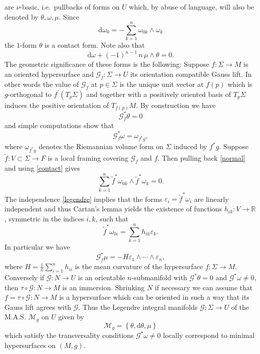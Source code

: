 \documentclass[11pt,letterpaper]{amsart}
\theoremstyle{definition}
\numberwithin{equation}{section}
\begin{document}
are $\nu$-basic, i.e.~pullbacks of forms on $U$ which, by abuse of language, will also be denoted by $\theta,\omega,\mu$. Since
\begin{equation}\label{contact}
{\mathrm{d}}\omega_0=-\sum_{k=1}^n\omega_{0k}\wedge \omega_k
\end{equation}
the $1$-form $\theta$ is a contact form. Note also that
\begin{equation}\label{exact}
{\mathrm{d}}\omega+(-1)^{n-1}\,n\,\mu\wedge\theta=0. 
\end{equation}
The geometric significance of these forms is the following: Suppose $f : \Sigma \to M$ is an oriented hypersurface and $\mathcal{G}_f : \Sigma \to U$ its orientation compatible Gauss lift. In other words the value of $\mathcal{G}_f$ at $p \in \Sigma$ is the unique unit vector at $f(p)$ which is $g$-orthogonal to $f^{\prime}(T_p\Sigma)$ and together with a positively oriented basis of $T_p\Sigma$ induces the positive orientation of $T_{f(p)}M$. By construction we have 
\begin{equation}\label{normal}
\mathcal{G}_f^*\theta=0
\end{equation}
and simple computations show that
\begin{equation}\label{legendre}
\mathcal{G}_f^*\omega=\omega_{f^*g},
\end{equation}
where $\omega_{f^*g}$ denotes the Riemannian volume form on $\Sigma$ induced by $f^*g$. Suppose $\tilde{f} : V \subset \Sigma\to F$ is a local framing covering $\mathcal{G}_f$ and $f$. Then pulling back \eqref{normal} and using \eqref{contact} gives 
$$
\sum_{k=1}^n\tilde{f}^*{\omega_{0k}}\wedge \tilde{f}^*{\omega_k}=0.
$$  
The independence \eqref{legendre} implies that the forms $\varepsilon_i=\tilde{f}^*\omega_i$ are linearly independent and thus Cartan's lemma yields the existence of functions $h_{ik} : V \to {\mathbb{R}}$, symmetric in the indices $i,k$, such that
$$
\tilde{f}^*\omega_{0i}=\sum_{k=1}^n h_{ik} \varepsilon_k. 
$$
In particular we have 
\begin{equation}\label{minimal}
\mathcal{G}_f^*\mu=-H \varepsilon_1\wedge\cdots\wedge\varepsilon_n,
\end{equation}
where $H=\frac{1}{n}\sum_{i=1}^n h_{ii}$ is the mean curvature of the hypersurface $f : \Sigma \to M$. Conversely if $\mathcal{G} : N \to U$ is an orientable $n$-submanifold with $\mathcal{G}^*\theta=0$ and $\mathcal{G}^*\omega \neq 0$, then $\tau \circ \mathcal{G} : N \to M$ is an immersion. Shrinking $N$ if necessary we can assume that $f=\tau \circ \mathcal{G} : N \to M$ is a hypersurface which can be oriented in such a way that its Gauss lift agrees with $\mathcal{G}$. Thus the Legendre integral manifolds $\mathcal{G} : \Sigma \to U$ of the M.A.S. $\mathcal{M}_g$ on $U$ given by
$$
\mathcal{M}_g=\left\{\theta,{\mathrm{d}}\theta,\mu\right\}
$$
which satisfy the transversality conditions $\mathcal{G}^*\omega\neq0$ locally correspond to minimal hypersurfaces on $(M,g)$. 
\end{document}
